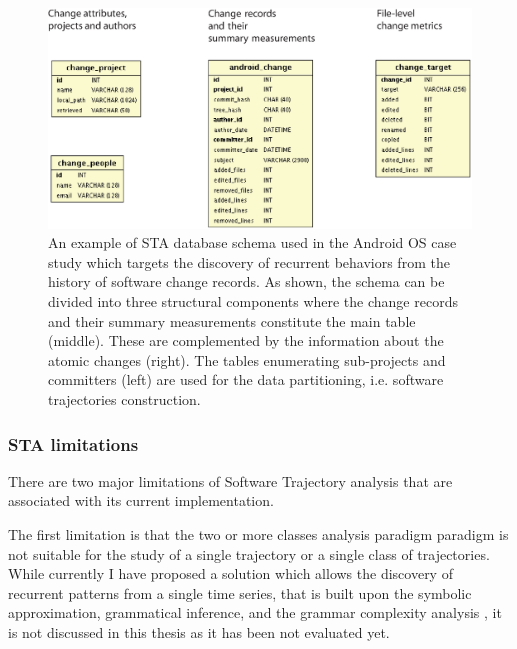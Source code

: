 \begin{figure}[t]
   \centering
   \includegraphics[width=150mm]{figures/sta-schema.eps}
   \caption{An example of STA database schema used in the Android OS case study which targets the discovery of
   recurrent behaviors from the history of software change records. As shown, the schema can be divided into three 
   structural components where the change records and their summary measurements constitute the main table (middle).
   These are complemented by the information about the atomic changes (right). 
   The tables enumerating sub-projects and committers (left) are used for the data partitioning, i.e. software trajectories construction.}
   \label{fig:db-schema}
\end{figure}

\subsubsection{STA limitations}\label{sta_limitations}
There are two major limitations of Software Trajectory analysis that are associated with its current implementation.

The first limitation is that the two or more classes analysis paradigm paradigm is not suitable for the study of a single trajectory or a single class of trajectories. While currently I have proposed a solution which allows the discovery of recurrent patterns from a single time series, that is built upon the symbolic approximation, grammatical inference, and the grammar complexity analysis \cite{grammarviz2}, it is not discussed in this thesis as it has been not evaluated yet.

